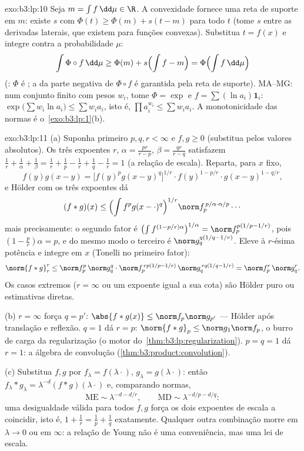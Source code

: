\begin{solution}{exo:b3:lp:10}
Seja $m = \int f\,\dd\mu \in \R$. A convexidade fornece uma reta de
suporte em $m$: existe $s$ com $\Phi(t) \geq \Phi(m) + s(t -
m)$ para todo $t$ (tome $s$ entre as derivadas laterais,
que existem para funções convexas). Substitua $t = f(x)$ e
integre contra a probabilidade $\mu$:
\[
\int\Phi\circ f\,\dd\mu \geq \Phi(m) + s\Bigl(\int f - m\Bigr)
= \Phi\Bigl(\int f\,\dd\mu\Bigr)
\]
(: $\Phi$ é ; a  da
parte negativa de $\Phi\circ f$ é garantida pela reta de
suporte). MA--MG: num conjunto finito com pesos $w_i$, tome
$\Phi = \exp$ e $f = \sum(\ln a_i)\mathbf 1_i$:
$\exp\bigl(\sum w_i\ln a_i\bigr) \leq \sum w_ia_i$, isto é,
$\prod a_i^{w_i} \leq \sum w_ia_i$. A monotonicidade das normas é
o~\cref{exo:b3:lp:1}(b).
\end{solution}

\begin{solution}{exo:b3:lp:11}
(a) Suponha primeiro $p, q, r < \infty$ e $f, g \geq 0$
(substitua pelos valores absolutos). Os três expoentes $r$,
$\alpha = \frac{pr}{r-p}$, $\beta = \frac{qr}{r-q}$
satisfazem $\frac1r + \frac1\alpha + \frac1\beta = \frac1r +
\frac1p - \frac1r + \frac1q - \frac1r = 1$ (a relação de
escala). Reparta, para $x$ fixo,
\[
f(y)g(x-y) = \bigl[f(y)^pg(x-y)^q\bigr]^{1/r}\cdot
f(y)^{1 - p/r}\cdot g(x-y)^{1 - q/r},
\]
e Hölder com os três expoentes dá
\[
(f*g)(x) \leq \Bigl(\int f^pg(x-\cdot)^q\Bigr)^{1/r}
\norm f_p^{\,p/\alpha\cdot\alpha/p}\cdots
\]
mais precisamente: o segundo fator é
$\bigl(\int f^{(1-p/r)\alpha}\bigr)^{1/\alpha} =
\norm f_p^{p(1/p - 1/r)}$, pois $(1 - \frac pr)\alpha = p$,
e do mesmo modo o terceiro é $\norm g_q^{q(1/q - 1/r)}$. Eleve
à $r$-ésima potência e integre em $x$ (Tonelli no
primeiro fator):
\[
\norm{f*g}_r^r \leq \norm f_p^p\,\norm g_q^q\cdot
\norm f_p^{\,rp(1/p - 1/r)}\,\norm g_q^{\,rq(1/q - 1/r)}
= \norm f_p^r\,\norm g_q^r .
\]
Os casos extremos ($r = \infty$ ou um expoente igual a
sua cota) são Hölder puro ou estimativas diretas.

(b) $r = \infty$ força $q = p'$: $\abs{f*g(x)} \leq \norm
f_p\norm g_{p'}$ --- Hölder após translação e reflexão.
$q = 1$ dá $r = p$: $\norm{f*g}_p \leq \norm
g_1\norm f_p$, o burro de carga da regularização
(o motor do~\cref{thm:b3:lp:regularization}). $p = q = 1$
dá $r = 1$: a álgebra de convolução
(\cref{thm:b3:product:convolution}).

(c) Substitua $f, g$ por $f_\lambda = f(\lambda\cdot)$,
$g_\lambda = g(\lambda\cdot)$: então $f_\lambda*g_\lambda =
\lambda^{-d}(f*g)(\lambda\cdot)$ e, comparando normas,
\[
\text{ME} \sim \lambda^{-d - d/r}, \qquad
\text{MD} \sim \lambda^{-d/p - d/q} :
\]
uma desigualdade válida para todos $f, g$ força os dois expoentes de
escala a coincidir, isto é, $1 + \frac1r = \frac1p + \frac1q$
exatamente. Qualquer outra combinação morre em $\lambda \to 0$ ou em
$\infty$: a relação de Young não é uma conveniência, mas uma
lei de escala.
\end{solution}

